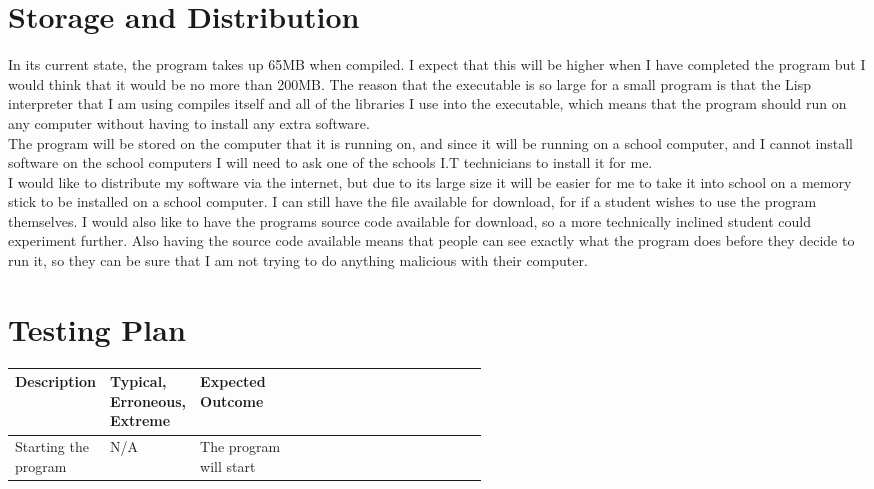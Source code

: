 \section{Storage and Distribution}

In its current state, the program takes up 65MB when compiled. I expect that
this will be higher when I have completed the program but I would think that it
would be no more than 200MB. The reason that the executable is so large for a
small program is that the Lisp interpreter that I am using compiles itself and
all of the libraries I use into the executable, which means that the program
should run on any computer without having to install any extra software. \\

The program will be stored on the computer that it is running on, and since it
will be running on a school computer, and I cannot install software on the
school computers I will need to ask one of the schools I.T technicians to
install it for me. \\

I would like to distribute my software via the internet, but due to its large
size it will be easier for me to take it into school on a memory stick to be
installed on a school computer. I can still have the file available for
download, for if a student wishes to use the program themselves. I would also
like to have the programs source code available for download, so a more
technically inclined student could experiment further. Also having the source
code available means that people can see exactly what the program does before
they decide to run it, so they can be sure that I am not trying to do anything
malicious with their computer. \\

\section{Testing Plan}

\begin{tabular}{|p{0.2\linewidth}|p{0.15\linewidth}|p{0.2\linewidth}|} \hline
	Description & Typical, Erroneous, Extreme & Expected Outcome \\ \hline
	Starting the program & N/A & The program will start && \\ \hline
	
\end{tabular}

